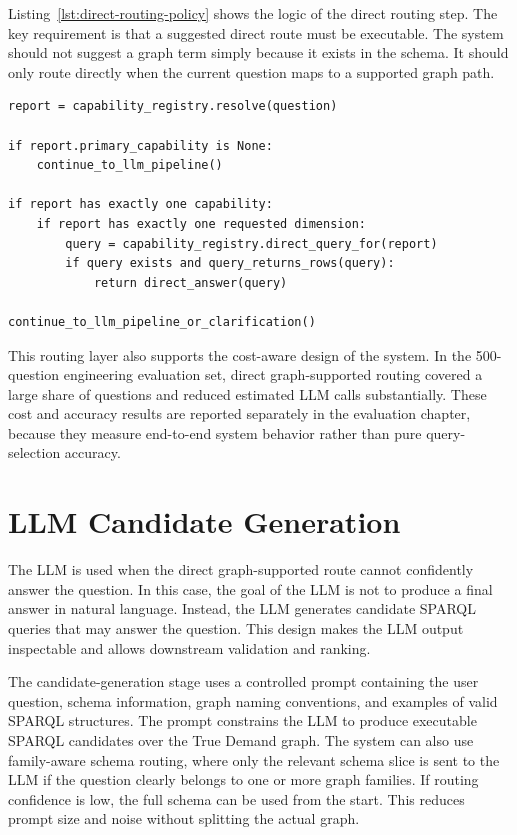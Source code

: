 Listing~\ref{lst:direct-routing-policy} shows the logic of the direct routing step. The key requirement is that a suggested direct route must be executable. The system should not suggest a graph term simply because it exists in the schema. It should only route directly when the current question maps to a supported graph path.

\begin{lstlisting}[caption={Direct graph-supported routing policy.}, label={lst:direct-routing-policy}]
report = capability_registry.resolve(question)

if report.primary_capability is None:
    continue_to_llm_pipeline()

if report has exactly one capability:
    if report has exactly one requested dimension:
        query = capability_registry.direct_query_for(report)
        if query exists and query_returns_rows(query):
            return direct_answer(query)

continue_to_llm_pipeline_or_clarification()
\end{lstlisting}

This routing layer also supports the cost-aware design of the system. In the 500-question engineering evaluation set, direct graph-supported routing covered a large share of questions and reduced estimated LLM calls substantially. These cost and accuracy results are reported separately in the evaluation chapter, because they measure end-to-end system behavior rather than pure query-selection accuracy.

\section{LLM Candidate Generation}
\label{sec:llm-candidate-generation}

The LLM is used when the direct graph-supported route cannot confidently answer the question. In this case, the goal of the LLM is not to produce a final answer in natural language. Instead, the LLM generates candidate SPARQL queries that may answer the question. This design makes the LLM output inspectable and allows downstream validation and ranking.

The candidate-generation stage uses a controlled prompt containing the user question, schema information, graph naming conventions, and examples of valid SPARQL structures. The prompt constrains the LLM to produce executable SPARQL candidates over the True Demand graph. The system can also use family-aware schema routing, where only the relevant schema slice is sent to the LLM if the question clearly belongs to one or more graph families. If routing confidence is low, the full schema can be used from the start. This reduces prompt size and noise without splitting the actual graph.

